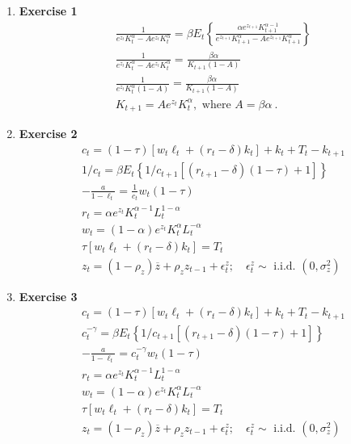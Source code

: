 \documentclass[12pt, letterpaper,bibtotoc, tablecaptionabove, figurecaptionabove]{article}
\begin{document}
\begin{enumerate}
\item{\bf{Exercise 1}}
\begin{eqnarray*}
\frac{1}{e^{z_{t}} K_{t}^{\alpha}-Ae^{z_t}K_t^\alpha}=
\beta E_{t}\left\{\frac{\alpha e^{z_{t+1}} K_{t+1}^{\alpha-1}}{e^{z_{t+1}} K_{t+1}^{\alpha}-Ae^{z_{t+1}}K_{t+1}^\alpha}\right\}\\
\frac{1}{e^{z_{t}} K_{t}^{\alpha}-Ae^{z_t}K_t^\alpha}=\frac{\beta \alpha}{K_{t+1}(1-A)}\\
\frac{1}{e^{z_{t}} K_{t}^{\alpha}(1-A)}=\frac{\beta \alpha}{K_{t+1}(1-A)}\\
K_{t+1}=A e^{z_t}K_t^\alpha, \text{ where } A=\beta \alpha \ .
\end{eqnarray*}
\item{\bf{Exercise 2}}
\begin{eqnarray*}
c_{t}=(1-\tau)\left[w_{t} \ell_{t}+\left(r_{t}-\delta\right) k_{t}\right]+k_{t}+T_{t}-k_{t+1}\\
1/c_t=\beta E_{t}\left\{1/c_{t+1}\left[\left(r_{t+1}-\delta\right)(1-\tau)+1\right]\right\}\\
-\frac{a}{1-\ell_t}=\frac{1}{c_t} w_{t}(1-\tau)\\
r_t=\alpha e^{z_t}K_t^{\alpha-1}L_t^{1-\alpha} \\
 w_t=(1-\alpha)e^{z_t}K_t^\alpha L_t^{-\alpha} \\ 
{\tau\left[w_{t} \ell_{t}+\left(r_{t}-\delta\right) k_{t}\right]=T_{t}} \\ 
{z_{t}=\left(1-\rho_{z}\right) \overline{z}+\rho_{z} z_{t-1}+\epsilon_{t}^{z} ; \quad \epsilon_{t}^{z} \sim \text { i.i.d. }\left(0, \sigma_{z}^{2}\right)}
\end{eqnarray*}
\item{\bf{Exercise 3}}
\begin{eqnarray*}
c_{t}=(1-\tau)\left[w_{t} \ell_{t}+\left(r_{t}-\delta\right) k_{t}\right]+k_{t}+T_{t}-k_{t+1}\\
c_t^{-\gamma}=\beta E_{t}\left\{1/c_{t+1}\left[\left(r_{t+1}-\delta\right)(1-\tau)+1\right]\right\}\\
-\frac{a}{1-\ell_t}=c_t^{-\gamma} w_{t}(1-\tau)\\
r_t=\alpha e^{z_t}K_t^{\alpha-1}L_t^{1-\alpha} \\
 w_t=(1-\alpha)e^{z_t}K_t^\alpha L_t^{-\alpha} \\ 
{\tau\left[w_{t} \ell_{t}+\left(r_{t}-\delta\right) k_{t}\right]=T_{t}} \\ 
{z_{t}=\left(1-\rho_{z}\right) \overline{z}+\rho_{z} z_{t-1}+\epsilon_{t}^{z} ; \quad \epsilon_{t}^{z} \sim \text { i.i.d. }\left(0, \sigma_{z}^{2}\right)}
\end{eqnarray*}


\end{enumerate}
\end{document}
